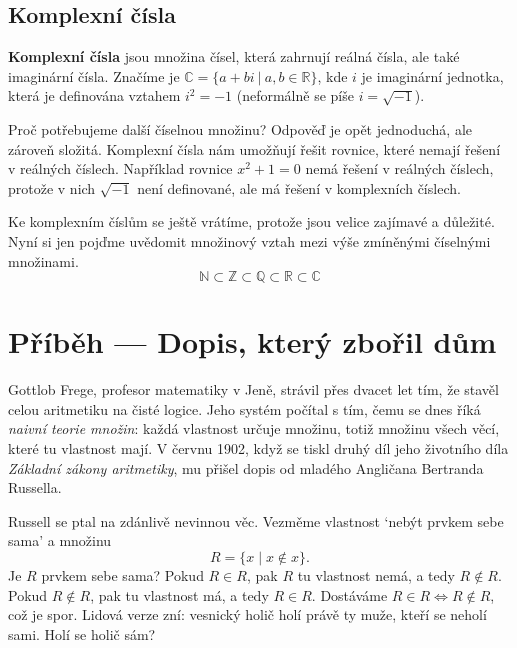 \subsection{Komplexní čísla}
\begin{definitionbox}
  \textbf{Komplexní čísla} jsou množina čísel, která zahrnují reálná čísla, ale také imaginární čísla. Značíme je $\mathbb{C} = \{a + bi\ |\ a, b\in\mathbb{R}\}$, kde $i$ je imaginární jednotka, která je definována vztahem $i^2 = -1$ (neformálně se píše $i = \sqrt{-1}$).
\end{definitionbox}

Proč potřebujeme další číselnou množinu? Odpověď je opět jednoduchá, ale zároveň složitá. Komplexní čísla nám umožňují řešit rovnice, které nemají řešení v reálných číslech. Například rovnice $x^2 + 1 = 0$ nemá řešení v reálných číslech, protože v nich $\sqrt{-1}$ není definované, ale má řešení v komplexních číslech.

Ke komplexním číslům se ještě vrátíme, protože jsou velice zajímavé a důležité. Nyní si jen pojďme uvědomit množinový vztah mezi výše zmíněnými číselnými množinami.
\begin{equation}
  \mathbb{N} \subset \mathbb{Z} \subset \mathbb{Q} \subset \mathbb{R} \subset \mathbb{C}
\end{equation}
\section{Příběh --- Dopis, který zbořil dům}

Gottlob Frege, profesor matematiky v Jeně, strávil přes dvacet let tím, že stavěl celou aritmetiku na čisté logice. Jeho systém počítal s tím, čemu se dnes říká \textit{naivní teorie množin}: každá vlastnost určuje množinu, totiž množinu všech věcí, které tu vlastnost mají. V červnu 1902, když se tiskl druhý díl jeho životního díla \textit{Základní zákony aritmetiky}, mu přišel dopis od mladého Angličana Bertranda Russella.

Russell se ptal na zdánlivě nevinnou věc. Vezměme vlastnost `nebýt prvkem sebe sama' a množinu
\begin{equation*}
  R = \{x \mid x\notin x\}.
\end{equation*}
Je $R$ prvkem sebe sama? Pokud $R\in R$, pak $R$ tu vlastnost nemá, a tedy $R\notin R$. Pokud $R\notin R$, pak tu vlastnost má, a tedy $R\in R$. Dostáváme $R\in R\Leftrightarrow R\notin R$, což je spor. Lidová verze zní: vesnický holič holí právě ty muže, kteří se neholí sami. Holí se holič sám?

